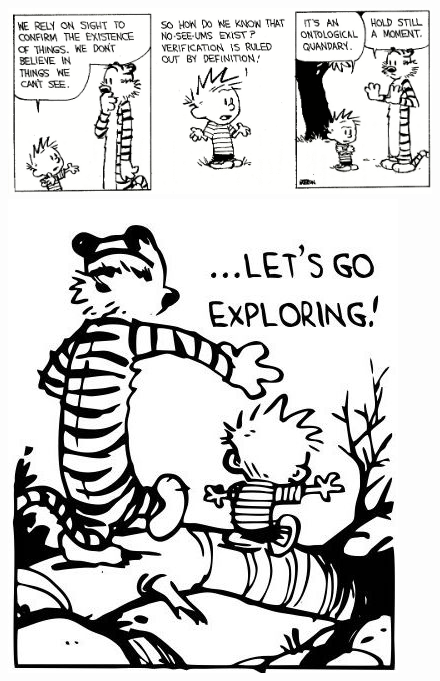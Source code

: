 \cleardoublepage


\thispagestyle{empty}
\newpage
\null
\vfill
%

\begin{figure}[tbph]
		\centering
       \includegraphics[width=0.6\linewidth]{./holdstill}
   	    \includegraphics[width=0.6\linewidth]{./CALVINandHOBBES_LETS_GO_EXPLORING_original_grande}
		
\end{figure}
\vfill